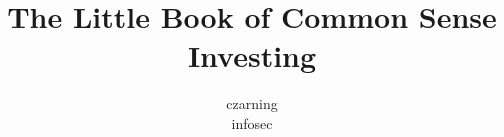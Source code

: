 \title{The Little Book of Common Sense Investing}
\author{czarning\\infosec}
\date{}                                 %
\maketitle
\tableofcontents                  %

